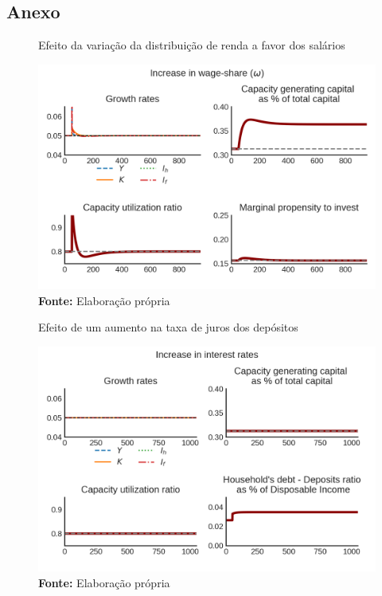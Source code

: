 \documentclass[
article,			%
12pt,				%
a4paper,			%
hidelinks,
oneside,
english,			%
brazil				%
]{abntex2}
\begin{document}
\singlespace
\textual







\printbibliography{}

\begin{appendices}
\section{Anexo}
\label{append}



\begin{figure}[htb]
    \centering
    \label{choque_2}
    \caption{Efeito da variação da distribuição de renda a favor dos salários}
    \includegraphics{Modelo/Shock_2.png}
    \caption*{\textbf{Fonte:} Elaboração própria}
\end{figure}



\begin{figure}[htb]
    \centering
    \label{choque_3}
    \caption{Efeito de um aumento na taxa de juros dos depósitos}
    \includegraphics{Modelo/Shock_3.png}
    \caption*{\textbf{Fonte:} Elaboração própria}
\end{figure}



\end{appendices}
\end{document}
